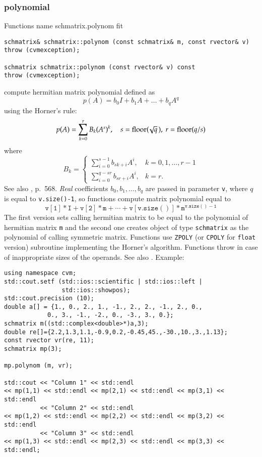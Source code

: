 \subsubsection{polynomial}
Functions%
\pdfdest name {schmatrix.polynom} fit
\begin{verbatim}
schmatrix& schmatrix::polynom (const schmatrix& m, const rvector& v)
throw (cvmexception);

schmatrix schmatrix::polynom (const rvector& v) const
throw (cvmexception);
\end{verbatim}
compute  hermitian matrix polynomial defined as
\begin{equation*}
p(A)=b_0I+b_1A+\dots+b_qA^q
\end{equation*}
using the Horner's rule:
\begin{equation*}
p(A)=\sum_{k=0}^r B_k(A^s)^k,\quad s=\operatorname{floor}(\!\sqrt{q}\,),\ r=\operatorname{floor}(q/s)
\end{equation*}
where
\begin{equation*}
B_k=\begin{cases}
\sum\limits_{i=0}^{s-1}b_{sk+i} A^i, & k=0,1,\dots,r-1\\
\sum\limits_{i=0}^{q-sr}b_{sr+i} A^i, & k=r.
\end{cases}
\end{equation*}
See also , p.~568.
\emph{Real} coefficients $b_0,b_1,\dots,b_q$ are 
passed in  parameter \verb"v",
where $q$ is equal to \verb"v.size()-1", so  functions
compute matrix polynomial equal to
\begin{equation*}
\mathtt{v[1]*I + v[2]*m +\cdots + v[v.size()]*m^{v.size()-1}}
\end{equation*}
The first version sets calling hermitian matrix to be equal 
to the polynomial of hermitian matrix \verb"m"
and the second one
creates object of type \verb"schmatrix" as the 
polynomial of calling symmetric matrix.
Functions use \verb"ZPOLY" (or \verb"CPOLY" for \verb"float" version)
\FORTRAN subroutine implementing the Horner's algorithm.
Functions throw   
in case of inappropriate sizes of the operands.
See also
.
Example:
\begin{Verbatim}
using namespace cvm;
std::cout.setf (std::ios::scientific | std::ios::left |
                std::ios::showpos);
std::cout.precision (10);
double a[] = {1., 0., 2., 1., -1., 2., 2., -1., 2., 0.,
            0., 3., -1., -2., 0., -3., 3., 0.};
schmatrix m((std::complex<double>*)a,3);
double re[]={2.2,1.3,1.1,-0.9,0.2,-0.45,45.,-30.,10.,3.,1.13};
const rvector vr(re, 11);
schmatrix mp(3);

mp.polynom (m, vr);

std::cout << "Column 1" << std::endl
<< mp(1,1) << std::endl << mp(2,1) << std::endl << mp(3,1) << std::endl
          << "Column 2" << std::endl
<< mp(1,2) << std::endl << mp(2,2) << std::endl << mp(3,2) << std::endl
          << "Column 3" << std::endl
<< mp(1,3) << std::endl << mp(2,3) << std::endl << mp(3,3) << std::endl;
\end{Verbatim}
